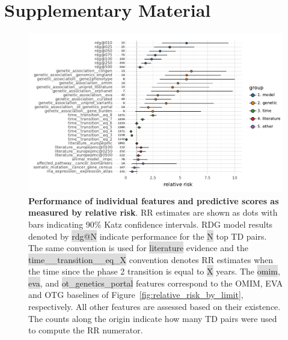 \documentclass{article}
\begin{document}
\pagebreak



\clearpage



\clearpage

\section{Supplementary Material}

\pagebreak

\begin{figure}[H]
  \centering
  \captionsetup{width=.9\linewidth}
  \includegraphics[width=1\textwidth]{relative_risk_core_features.pdf}
  \caption{
    \textbf{Performance of individual features and predictive scores as measured by relative risk}.
    RR estimates are shown as dots with bars indicating 90\% Katz confidence intervals.
    RDG model results denoted by \colorbox{Gainsboro}{rdg@N} indicate performance for the \colorbox{Gainsboro}{N} top TD pairs. The same convention is used for \colorbox{Gainsboro}{literature} evidence and the \colorbox{Gainsboro}{time\_\_transition\_\_eq\_X} convention denotes RR estimates when the time since the phase 2 transition is equal to \colorbox{Gainsboro}{X} years. The \colorbox{Gainsboro}{omim}, \colorbox{Gainsboro}{eva}, and \colorbox{Gainsboro}{ot\_genetics\_portal} features correspond to the OMIM, EVA and OTG baselines of Figure~\ref{fig:relative_risk_by_limit}, respectively. All other features are assessed based on their existence. The counts along the origin indicate how many TD pairs were used to compute the RR numerator.
  }
  \label{fig:relative_risk_core_features}
\end{figure}
\end{document}
